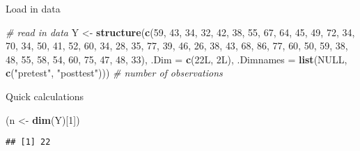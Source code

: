 \documentclass[ignorenonframetext,]{beamer}
\newenvironment{Shaded}{\begin{snugshade}}{\end{snugshade}}
\newcommand{\KeywordTok}[1]{\textcolor[rgb]{0.13,0.29,0.53}{\textbf{#1}}}
\newcommand{\DataTypeTok}[1]{\textcolor[rgb]{0.13,0.29,0.53}{#1}}
\newcommand{\DecValTok}[1]{\textcolor[rgb]{0.00,0.00,0.81}{#1}}
\newcommand{\StringTok}[1]{\textcolor[rgb]{0.31,0.60,0.02}{#1}}
\newcommand{\CommentTok}[1]{\textcolor[rgb]{0.56,0.35,0.01}{\textit{#1}}}
\newcommand{\OtherTok}[1]{\textcolor[rgb]{0.56,0.35,0.01}{#1}}
\newcommand{\NormalTok}[1]{#1}
\begin{document}
\begin{frame}[fragile]{Load in data}

\begin{Shaded}
\begin{Highlighting}[]
\CommentTok{# read in data}
\NormalTok{Y <-}\StringTok{ }\KeywordTok{structure}\NormalTok{(}\KeywordTok{c}\NormalTok{(}\DecValTok{59}\NormalTok{, }\DecValTok{43}\NormalTok{, }\DecValTok{34}\NormalTok{, }\DecValTok{32}\NormalTok{, }\DecValTok{42}\NormalTok{, }\DecValTok{38}\NormalTok{, }\DecValTok{55}\NormalTok{, }\DecValTok{67}\NormalTok{, }\DecValTok{64}\NormalTok{, }
                 \DecValTok{45}\NormalTok{, }\DecValTok{49}\NormalTok{, }\DecValTok{72}\NormalTok{, }\DecValTok{34}\NormalTok{, }\DecValTok{70}\NormalTok{, }\DecValTok{34}\NormalTok{, }\DecValTok{50}\NormalTok{, }\DecValTok{41}\NormalTok{, }\DecValTok{52}\NormalTok{, }
                 \DecValTok{60}\NormalTok{, }\DecValTok{34}\NormalTok{, }\DecValTok{28}\NormalTok{, }\DecValTok{35}\NormalTok{, }\DecValTok{77}\NormalTok{, }\DecValTok{39}\NormalTok{, }\DecValTok{46}\NormalTok{, }\DecValTok{26}\NormalTok{, }\DecValTok{38}\NormalTok{, }
                 \DecValTok{43}\NormalTok{, }\DecValTok{68}\NormalTok{, }\DecValTok{86}\NormalTok{, }\DecValTok{77}\NormalTok{, }\DecValTok{60}\NormalTok{, }\DecValTok{50}\NormalTok{, }\DecValTok{59}\NormalTok{, }\DecValTok{38}\NormalTok{, }\DecValTok{48}\NormalTok{, }
                 \DecValTok{55}\NormalTok{, }\DecValTok{58}\NormalTok{, }\DecValTok{54}\NormalTok{, }\DecValTok{60}\NormalTok{, }\DecValTok{75}\NormalTok{, }\DecValTok{47}\NormalTok{, }\DecValTok{48}\NormalTok{, }\DecValTok{33}\NormalTok{), }
               \DataTypeTok{.Dim =} \KeywordTok{c}\NormalTok{(22L, 2L), }\DataTypeTok{.Dimnames =} \KeywordTok{list}\NormalTok{(}\OtherTok{NULL}\NormalTok{, }
                \KeywordTok{c}\NormalTok{(}\StringTok{"pretest"}\NormalTok{, }\StringTok{"posttest"}\NormalTok{)))}
\CommentTok{# number of observations}
\end{Highlighting}
\end{Shaded}

Quick calculations

\begin{Shaded}
\begin{Highlighting}[]
\NormalTok{(n <-}\StringTok{ }\KeywordTok{dim}\NormalTok{(Y)[}\DecValTok{1}\NormalTok{])}
\end{Highlighting}
\end{Shaded}

\begin{verbatim}
## [1] 22
\end{verbatim}


\end{frame}
\end{document}
